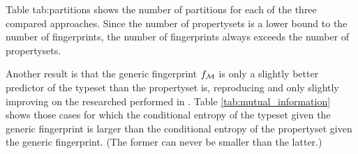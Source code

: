 Table {tab:partitions} shows the number of partitions for each of the three
 compared approaches.
Since the number of propertysets is a lower bound to the number of fingerprints,
 the number of fingerprints always exceeds the number of propertysets.

Another result is that the generic fingerprint $f_{\mathcal M}$ is
 only a slightly better predictor
 of the typeset than the propertyset is,
 reproducing and only slightly improving on
 the researched performed in \cite{GottronKSS13}.
Table \ref{tab:mutual_information} shows those cases for which
  the conditional entropy of the typeset given the generic fingerprint
 is larger than
  the conditional entropy of the propertyset given the generic fingerprint.
(The former can never be smaller than the latter.)
